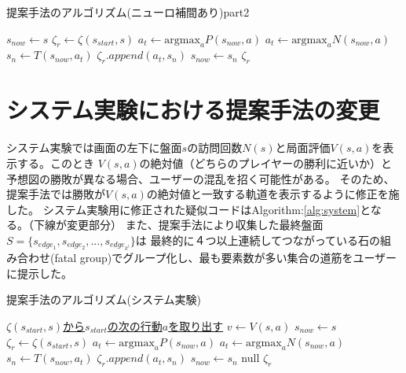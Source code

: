 \begin{algorithm}
    \caption{提案手法のアルゴリズム(ニューロ補間あり)part2}
    \begin{algorithmic}[1] 
        \State $s_{now} \gets s$
        \State $\zeta_r \gets \zeta(s_{start}, s)$
                \State \underline{$a_t \gets \textrm{argmax}_a P(s_{now}, a)$}
            \Else
                \State $a_t \gets \textrm{argmax}_a N(s_{now}, a)$
            \EndIf
            \State $s_n \gets T(s_{now}, a_t)$
            \State $\zeta_r.append({a_t, s_n})$
            \State $s_{now} \gets s_n$
        \EndWhile
        \Return $\zeta_r$
        \EndFunction
       
        
    \end{algorithmic}
\end{algorithm}
\section{システム実験における提案手法の変更}
システム実験では画面の左下に盤面$s$の訪問回数$N(s)$と局面評価$V(s, a)$を表示する。このとき
$V(s, a)$の絶対値（どちらのプレイヤーの勝利に近いか）と予想図の勝敗が異なる場合、ユーザーの混乱を招く可能性がある。
そのため、提案手法では勝敗が$V(s, a)$の絶対値と一致する軌道を表示するように修正を施した。
システム実験用に修正された疑似コードはAlgorithm:\ref{alg:system}となる。（下線が変更部分）
また、提案手法により収集した最終盤面$S=\{s_{edge_1}, s_{edge_2}, ..., s_{edge_{k^l}}\}$は
最終的に４つ以上連続してつながっている石の組み合わせ(fatal group)でグループ化し、最も要素数が多い集合の道筋をユーザーに提示した。

\begin{algorithm}
    \caption{提案手法のアルゴリズム(システム実験)}
    \label{alg:system}
    \begin{algorithmic}[1]       
        
        \State  \underline{$\zeta(s_{start}, s)$から$s_{start}$の次の行動$a$を取り出す}
        \State \underline{$v \gets V(s, a)$}
        \State $s_{now} \gets s$
        \State $\zeta_r \gets \zeta(s_{start}, s)$
                \State \underline{$a_t \gets \textrm{argmax}_a P(s_{now}, a)$}
            \Else
                \State $a_t \gets \textrm{argmax}_a N(s_{now}, a)$
            \EndIf
            \State $s_n \gets T(s_{now}, a_t)$
            \State $\zeta_r.append({a_t, s_n})$
            \State $s_{now} \gets s_n$
        \EndWhile
           \Return null
        \EndIf
        \Return $\zeta_r$
        \EndFunction
       
        
    \end{algorithmic}
\end{algorithm}
